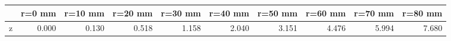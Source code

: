 \documentclass[convert={convertexe={magick.exe}}]{standalone}
\begin{document}
\begin{tabular}{lrrrrrrrrr}
\toprule
{} &  r=0 mm &  r=10 mm &  r=20 mm &  r=30 mm &  r=40 mm &  r=50 mm &  r=60 mm &  r=70 mm &  r=80 mm \\
\midrule
z &   0.000 &    0.130 &    0.518 &    1.158 &    2.040 &    3.151 &    4.476 &    5.994 &    7.680 \\
\bottomrule
\end{tabular}
\end{document}
